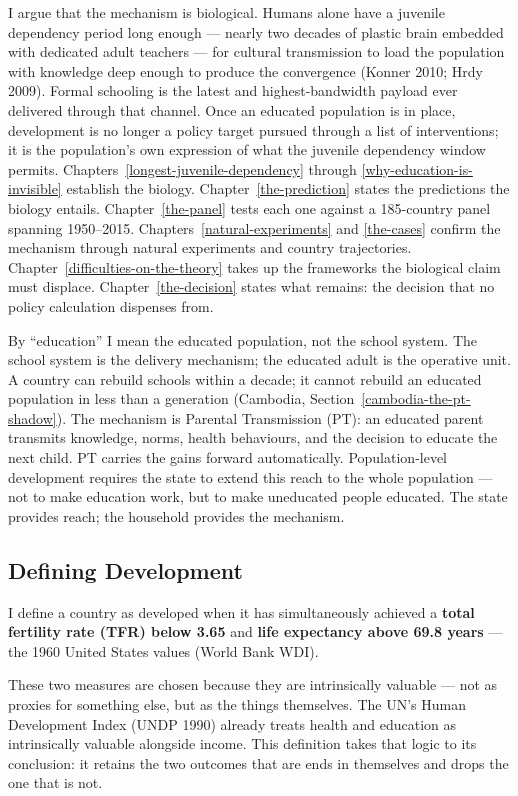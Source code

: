 \documentclass[12pt,letterpaper]{article}
\begin{document}
I argue that the mechanism is biological. Humans alone have
a juvenile dependency period long enough --- nearly two decades of
plastic brain embedded with dedicated adult teachers --- for cultural
transmission to load the population with knowledge deep enough to
produce the convergence (Konner 2010; Hrdy 2009). Formal schooling is
the latest and highest-bandwidth payload ever delivered through that
channel. Once an educated population is in place, development is no
longer a policy target pursued through a list of interventions; it is
the population's own expression of what the juvenile dependency window
permits. Chapters~\ref{longest-juvenile-dependency} through
\ref{why-education-is-invisible} establish the biology.
Chapter~\ref{the-prediction} states the predictions the biology
entails. Chapter~\ref{the-panel} tests each one against a 185-country
panel spanning 1950--2015.
Chapters~\ref{natural-experiments} and \ref{the-cases} confirm the
mechanism through natural experiments and country trajectories.
Chapter~\ref{difficulties-on-the-theory} takes up the frameworks the
biological claim must displace. Chapter~\ref{the-decision} states what
remains: the decision that no policy calculation dispenses from.

By ``education'' I mean the educated population, not the
school system. The school system is the delivery mechanism; the
educated adult is the operative unit. A country can rebuild schools
within a decade; it cannot rebuild an educated population in less than
a generation (Cambodia,
Section~\ref{cambodia-the-pt-shadow}). The mechanism is Parental
Transmission (PT): an educated parent transmits knowledge, norms,
health behaviours, and the decision to educate the next child. PT
carries the gains forward automatically. Population-level development
requires the state to extend this reach to the whole population ---
not to make education work, but to make uneducated people educated.
The state provides reach; the household provides the mechanism.

\subsection{Defining Development}\label{defining-development}

I define a country as developed when it has simultaneously achieved a
\textbf{total fertility rate (TFR) below 3.65} and \textbf{life
expectancy above 69.8 years} --- the 1960 United States values (World
Bank WDI).

These two measures are chosen because they are intrinsically valuable
--- not as proxies for something else, but as the things themselves.
The UN's Human Development Index (UNDP 1990) already treats health
and education as intrinsically valuable alongside income. This
definition takes that logic to its conclusion: it retains the two
outcomes that are ends in themselves and drops the one that is not.
\end{document}
